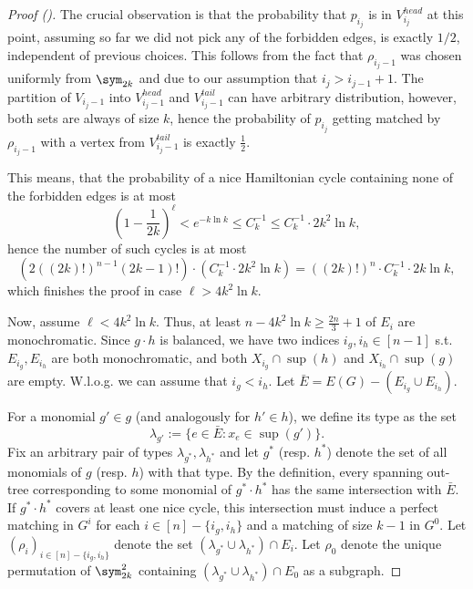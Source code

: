 \begin{proof}[Proof ()]
    The crucial observation is that the probability that $p_{i_j}$ is in $V_{i_j}^{head}$ at this point, assuming so far we did not pick any of the forbidden edges, is exactly $1/2$, independent of previous choices. This follows from the fact that $\rho_{i_j - 1}$ was chosen uniformly from $\sym_{2k}$ and due to our assumption that $i_j > i_{j - 1} + 1$. The partition of $V_{i_j - 1}$ into $V_{i_j - 1}^{head}$ and $V_{i_j - 1}^{tail}$ can have arbitrary distribution, however, both sets are always of size $k$, hence the probability of $p_{i_j}$ getting matched by $\rho_{i_j - 1}$ with a vertex from $V_{i_j - 1}^{tail}$ is exactly $\frac{1}{2}$.

    This means, that the probability of a nice Hamiltonian cycle containing none of the forbidden edges is at most
    $$
    \left( 1 - \frac{1}{2k} \right)^\ell < e^{-k \ln k} \leq C_k^{-1} \leq C_k^{-1} \cdot 2k^2 \ln k,
    $$
    hence the number of such cycles is at most
    $$
    \left( 2 ((2k)!)^{n-1} (2k - 1)! \right) 
        \cdot \left( C_k^{-1} \cdot 2k^2 \ln k \right) =
    ((2k)!)^n \cdot C_k^{-1} \cdot 2k \ln k,
    $$
    which finishes the proof in case $\ell > 4k^2 \ln k$.
    \newline
    

    Now, assume $\ell < 4k^2 \ln k$. Thus, at least $n - 4k^2 \ln k \geq \frac{2n}{3} + 1$ of $E_i$ are monochromatic. Since $g \cdot h$ is balanced, we have two indices $i_g, i_h \in [n - 1]$ s.t. $E_{i_g}, E_{i_h}$ are both monochromatic, and both $X_{i_g} \cap \sup(h)$ and  $X_{i_h} \cap \sup(g)$ are empty. W.l.o.g. we can assume that $i_g < i_h$. Let $\bar{E} = E(G) - (E_{i_g} \cup E_{i_h})$.

    For a monomial $g' \in g$ (and analogously for $h' \in h$), we define its type as the set
    $$
        \lambda_{g'} := \{ e \in \bar{E} : x_e \in \sup(g') \}.
    $$
    Fix an arbitrary pair of types $\lambda_{g^*}, \lambda_{h^*}$ and let $g^*$ (resp. $h^*$) denote the set of all monomials of $g$ (resp. $h$) with that type. By the definition, every spanning out-tree corresponding to some monomial of $g^* \cdot h^*$ has the same intersection with $\bar{E}$. If $g^* \cdot h^*$ covers at least one nice cycle, this intersection must induce a perfect matching in $G^i$ for each $i \in [n] - \{i_g, i_h\}$ and a matching of size $k - 1$ in $G^0$.
    Let $(\rho_i)_{i \in [n] - \{i_g, i_h\}}$ denote the set $(\lambda_{g^*} \cup \lambda_{h^*}) \cap E_i$. Let $\rho_0$ denote the unique permutation of $\sym_{2k}^2$ containing $(\lambda_{g^*} \cup \lambda_{h^*}) \cap E_0$ as a subgraph.
    

\end{proof}
